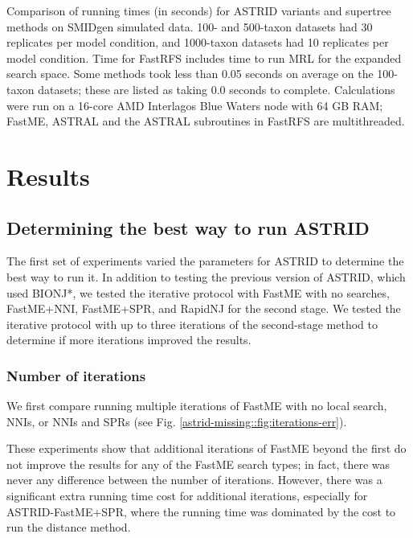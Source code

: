 \begin{table}[htb!]
     \caption[Running times (in seconds) for ASTRID variants and supertree methods on SMIDgen simulated data]{Comparison of running times (in seconds) for ASTRID variants and supertree methods on SMIDgen simulated data. 100- and 500-taxon datasets had 30 replicates per model condition, and 1000-taxon datasets had 10 replicates per model condition. Time for FastRFS includes time to run MRL for the expanded search space. Some methods took less than 0.05 seconds on average on the 100-taxon datasets; these are listed as taking 0.0 seconds to complete. Calculations were run on a 16-core AMD Interlagos Blue Waters node with 64 GB RAM; FastME, ASTRAL and the ASTRAL subroutines in FastRFS are multithreaded. }
    \label{astrid-missing::tab:runningtimes}
\end{table}
   

\section{Results}


\subsection{Determining the best way to run ASTRID}

The first set of experiments varied the parameters for ASTRID to determine the best way to run it. In addition to testing the previous version of ASTRID, which used BIONJ*, we tested the iterative protocol with FastME with no searches, FastME+NNI, FastME+SPR, and RapidNJ for the second stage. We tested the iterative protocol with up to three iterations of the second-stage method to determine if more iterations improved the results.

\subsubsection{Number of iterations}

We first compare running multiple iterations of FastME with no local search, NNIs, or NNIs and SPRs (see Fig. \ref{astrid-missing::fig:iterations-err}). 

These experiments show that additional iterations of FastME beyond the first do not improve the results for any of the FastME search types; in fact, there was never any difference between the number of iterations. However, there was a significant extra running time cost for additional iterations, especially for ASTRID-FastME+SPR, where the running time was dominated by the cost to run the distance method.

